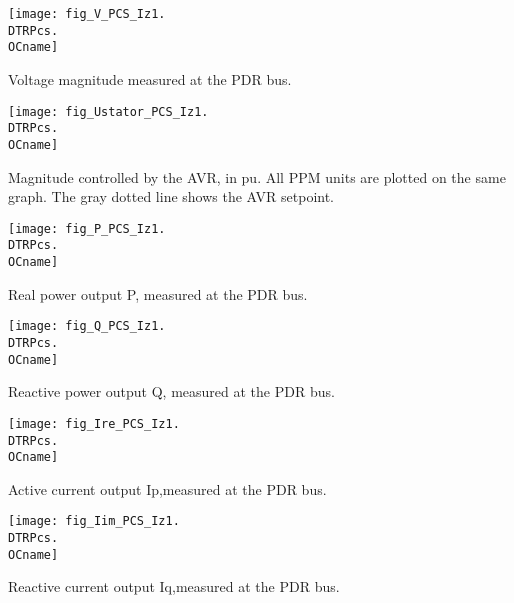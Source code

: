 {%
    \noindent
    \begin{minipage}[t]{0.48\textwidth}
        \centering
        \texttt{[image: fig\_V\_PCS\_Iz1.\\DTRPcs.\\OCname]}
        \begin{minipage}[t]{0.8\textwidth}
            \small Voltage magnitude measured at the PDR bus.
        \end{minipage}
    \end{minipage}
    \hfill
    \begin{minipage}[t]{0.48\textwidth}
        \centering
        \texttt{[image: fig\_Ustator\_PCS\_Iz1.\\DTRPcs.\\OCname]}
        \begin{minipage}[t]{0.8\textwidth}
            \small Magnitude controlled by the AVR, in pu. All PPM
            units are plotted on the same graph. The gray dotted
            line shows the AVR setpoint.
        \end{minipage}
    \end{minipage}
%
    \vspace{0.5cm}
    \begin{minipage}[t]{0.48\textwidth}
        \centering
        \texttt{[image: fig\_P\_PCS\_Iz1.\\DTRPcs.\\OCname]}
        \begin{minipage}[t]{0.8\textwidth}
            \small Real power output P, measured at the PDR bus.
        \end{minipage}
    \end{minipage}
    \hfill
    \begin{minipage}[t]{0.48\textwidth}
        \centering
        \texttt{[image: fig\_Q\_PCS\_Iz1.\\DTRPcs.\\OCname]}
        \begin{minipage}[t]{0.8\textwidth}
            \small Reactive power output Q, measured at the PDR bus.
        \end{minipage}
    \end{minipage}

    \vspace{0.5cm}
    \begin{minipage}[t]{0.48\textwidth}
        \centering
        \texttt{[image: fig\_Ire\_PCS\_Iz1.\\DTRPcs.\\OCname]}
        \begin{minipage}[t]{0.8\textwidth}
            \small Active current output Ip,measured at the PDR bus.
        \end{minipage}
    \end{minipage}
%
    \hfill
    \begin{minipage}[t]{0.48\textwidth}
        \centering
        \texttt{[image: fig\_Iim\_PCS\_Iz1.\\DTRPcs.\\OCname]}
        \begin{minipage}[t]{0.8\textwidth}
            \small Reactive current output Iq,measured at the PDR bus.
        \end{minipage}
    \end{minipage}
}
